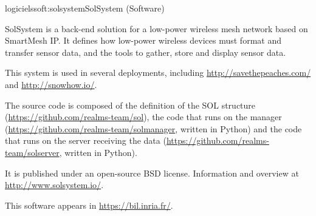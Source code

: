 \documentclass{ra2016}
\begin{document}
\begin{module}{logiciels}{soft:solsystem}{SolSystem (Software)}
\label{soft:solsystem}

\begin{participants}
\end{participants}

SolSystem is a back-end solution for a low-power wireless mesh network based on SmartMesh IP.
It defines how low-power wireless devices must format and transfer sensor data, and the tools to gather, store and display sensor data.

This system is used in several deployments, including \url{http://savethepeaches.com/} and \url{http://snowhow.io/}.

The source code is composed of the definition of
the SOL structure (\url{https://github.com/realms-team/sol}),
the code that runs on the manager (\url{https://github.com/realms-team/solmanager}, written in Python) and
the code that runs on the server receiving the data (\url{https://github.com/realms-team/solserver}, written in Python).

It is published under an open-source BSD license. Information and overview at \url{http://www.solsystem.io/}.

This software appears in \url{https://bil.inria.fr/}.

\end{module}
\end{document}
